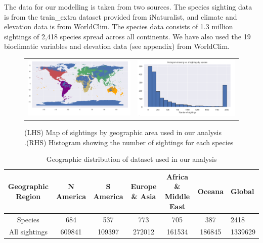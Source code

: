 \documentclass{article}
\begin{document}
The data for our modelling is taken from two sources. The species sighting data is from the train\_extra dataset provided from iNaturalist, and climate and elevation data is from WorldClim\cite{WorldClim}.  The species data consists of 1.3 million sightings of 2,418 species spread across all continents.  We have also used  the 19 bioclimatic variables and elevation data (see appendix) from WorldClim.
\begin{figure}[h]
\centering
\begin{tabular}{ll}
\includegraphics[scale=0.3]{Map_of_sightings.png}&
\includegraphics[scale=0.3]{Number of sightings per Species.png}\end{tabular}
\caption{(LHS) Map of sightings by geographic area used in our analysis \\.\hspace{1.3cm}(RHS) Histogram showing the number of sightings for each species}
\label{Fig:Map}
\end{figure}
\begin{table}[h]
    \centering
\begin{tabular}{|c|c|c|c|c|c|l|} \hline 
         Geographic Region&  N America&  S America&  Europe \& Asia&  Africa \& Middle East&  Oceana &Global\\ \hline 
         Species&  684&  537&  773&  705&   387&2418
\\ \hline 
         All sightings&  609841&  109397&  272012&  161534&   186845&1339629
\\\hline
    \end{tabular}
    \caption{Geographic distribution of dataset used in our analysis}
\label{tab:Geographic distribution of dataset}    
\end{table}
\end{document}
